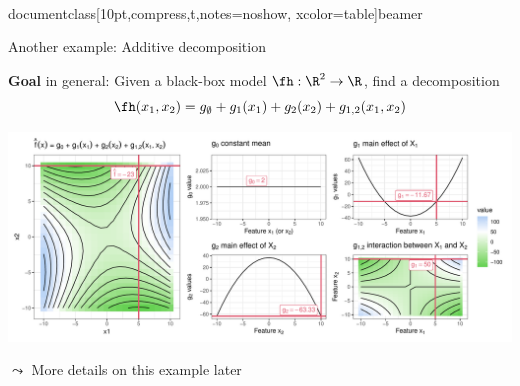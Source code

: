 \\documentclass[10pt,compress,t,notes=noshow, xcolor=table]{beamer}
\newcommand{\open}{}
\newcommand{\close}{}
\begin{document}
\begin{frame}{Another example: Additive decomposition}

    \textbf{Goal} in general:
    Given a black-box model \(\fh: \R^2 \to \R\), find a decomposition
    \begin{equation}
        \fh(x_1, x_2) =  g_\emptyset + g_1(x_1) + g_2(x_2) + g_{\open 1, 2 \close}(x_1, x_2)
    \end{equation}
    

    \pause
    \begin{example}
    
    
    \includegraphics[width = \textwidth]{figure/decomposition}
    
    $\leadsto$ More details on this example later
        
    \end{example}
    
\end{frame}
\end{document}
